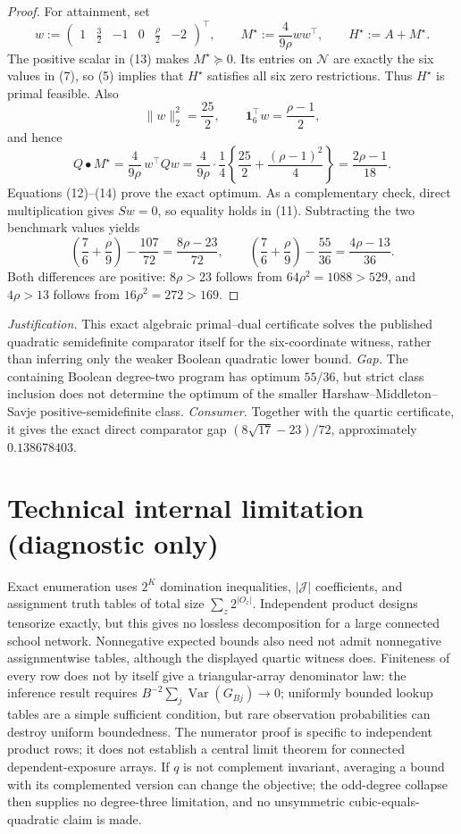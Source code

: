 \documentclass{article}
\begin{document}
\begin{proof}
For attainment, set
\[
w:=\begin{pmatrix}1&\frac32&-1&0&\frac\rho2&-2\end{pmatrix}^{\!\top},
\qquad
M^\star:=\frac4{9\rho}ww^\top,
\qquad
H^\star:=A+M^\star. \tag{13}
\]
The positive scalar in (13) makes \(M^\star\succeq0\).  Its entries on \(\mathcal N\) are exactly the six values in (7), so (5) implies that \(H^\star\) satisfies all six zero restrictions.  Thus \(H^\star\) is primal feasible.  Also
\[
\|w\|_2^2=\frac{25}{2},
\qquad
\mathbf 1_6^\top w=\frac{\rho-1}{2},
\]
and hence
\[
Q\mathbin\bullet M^\star
=\frac4{9\rho}\,w^\top Qw
=\frac4{9\rho}\cdot\frac14
\left\{\frac{25}{2}+\frac{(\rho-1)^2}{4}\right\}
=\frac{2\rho-1}{18}. \tag{14}
\]
Equations (12)--(14) prove the exact optimum.  As a complementary check, direct multiplication gives \(Sw=0\), so equality holds in (11).  Subtracting the two benchmark values yields
\[
\left(\frac76+\frac\rho9\right)-\frac{107}{72}
=\frac{8\rho-23}{72},
\qquad
\left(\frac76+\frac\rho9\right)-\frac{55}{36}
=\frac{4\rho-13}{36}. \tag{15}
\]
Both differences are positive: \(8\rho>23\) follows from \(64\rho^2=1088>529\), and \(4\rho>13\) follows from \(16\rho^2=272>169\).
\end{proof}
\par\smallskip\noindent \textit{Justification.} This exact algebraic primal--dual certificate solves the published quadratic semidefinite comparator itself for the six-coordinate witness, rather than inferring only the weaker Boolean quadratic lower bound. \textit{Gap.} The containing Boolean degree-two program has optimum \(55/36\), but strict class inclusion does not determine the optimum of the smaller Harshaw--Middleton--Savje positive-semidefinite class. \textit{Consumer.} Together with the quartic certificate, it gives the exact direct comparator gap \((8\sqrt{17}-23)/72\), approximately \(0.138678403\).

\section*{Technical internal limitation (diagnostic only)}

Exact enumeration uses \(2^K\) domination inequalities, \(|\mathcal J|\) coefficients, and assignment truth tables of total size \(\sum_z2^{|O_z|}\). Independent product designs tensorize exactly, but this gives no lossless decomposition for a large connected school network. Nonnegative expected bounds also need not admit nonnegative assignmentwise tables, although the displayed quartic witness does. Finiteness of every row does not by itself give a triangular-array denominator law: the inference result requires \(B^{-2}\sum_j\operatorname{Var}(G_{Bj})\to0\); uniformly bounded lookup tables are a simple sufficient condition, but rare observation probabilities can destroy uniform boundedness. The numerator proof is specific to independent product rows; it does not establish a central limit theorem for connected dependent-exposure arrays. If \(q\) is not complement invariant, averaging a bound with its complemented version can change the objective; the odd-degree collapse then supplies no degree-three limitation, and no unsymmetric cubic-equals-quadratic claim is made.
\end{document}
